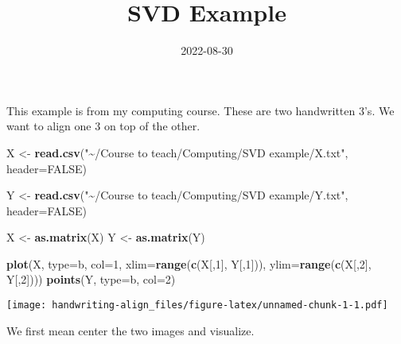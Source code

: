\documentclass[
]{article}
\title{SVD Example}
\author{}
\date{\vspace{-2.5em}2022-08-30}
\newenvironment{Shaded}{\begin{snugshade}}{\end{snugshade}}
\newcommand{\AttributeTok}[1]{\textcolor[rgb]{0.13,0.29,0.53}{#1}}
\newcommand{\ConstantTok}[1]{\textcolor[rgb]{0.56,0.35,0.01}{#1}}
\newcommand{\DecValTok}[1]{\textcolor[rgb]{0.00,0.00,0.81}{#1}}
\newcommand{\FunctionTok}[1]{\textcolor[rgb]{0.13,0.29,0.53}{\textbf{#1}}}
\newcommand{\NormalTok}[1]{#1}
\newcommand{\OtherTok}[1]{\textcolor[rgb]{0.56,0.35,0.01}{#1}}
\newcommand{\StringTok}[1]{\textcolor[rgb]{0.31,0.60,0.02}{#1}}
\begin{document}
\maketitle

This example is from my computing course. These are two handwritten 3's.
We want to align one 3 on top of the other.

\begin{Shaded}
\begin{Highlighting}[]
\NormalTok{X }\OtherTok{\textless{}{-}} \FunctionTok{read.csv}\NormalTok{(}\StringTok{"\textasciitilde{}/Course to teach/Computing/SVD example/X.txt"}\NormalTok{, }\AttributeTok{header=}\ConstantTok{FALSE}\NormalTok{)}

\NormalTok{Y }\OtherTok{\textless{}{-}} \FunctionTok{read.csv}\NormalTok{(}\StringTok{"\textasciitilde{}/Course to teach/Computing/SVD example/Y.txt"}\NormalTok{, }\AttributeTok{header=}\ConstantTok{FALSE}\NormalTok{)}

\NormalTok{X }\OtherTok{\textless{}{-}} \FunctionTok{as.matrix}\NormalTok{(X)}
\NormalTok{Y }\OtherTok{\textless{}{-}} \FunctionTok{as.matrix}\NormalTok{(Y)}

\FunctionTok{plot}\NormalTok{(X, }\AttributeTok{type=}\StringTok{\textquotesingle{}b\textquotesingle{}}\NormalTok{, }\AttributeTok{col=}\DecValTok{1}\NormalTok{, }\AttributeTok{xlim=}\FunctionTok{range}\NormalTok{(}\FunctionTok{c}\NormalTok{(X[,}\DecValTok{1}\NormalTok{], Y[,}\DecValTok{1}\NormalTok{])), }\AttributeTok{ylim=}\FunctionTok{range}\NormalTok{(}\FunctionTok{c}\NormalTok{(X[,}\DecValTok{2}\NormalTok{], Y[,}\DecValTok{2}\NormalTok{])))}
\FunctionTok{points}\NormalTok{(Y, }\AttributeTok{type=}\StringTok{\textquotesingle{}b\textquotesingle{}}\NormalTok{, }\AttributeTok{col=}\DecValTok{2}\NormalTok{)}
\end{Highlighting}
\end{Shaded}

\texttt{[image: handwriting-align\_files/figure-latex/unnamed-chunk-1-1.pdf]}

We first mean center the two images and visualize.
\end{document}

